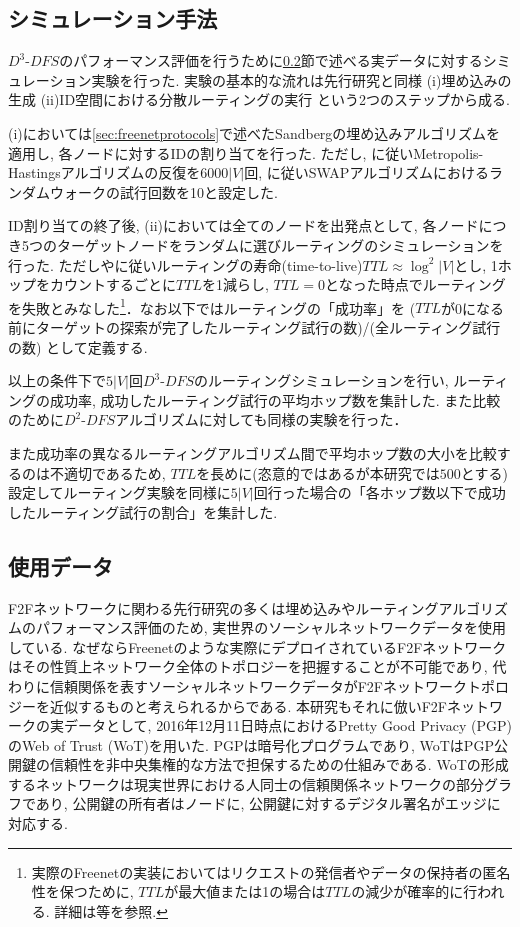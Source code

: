 \documentclass[technicalreport]{./ieicej-v3.0/UTF/ieicej}
\begin{document}
  \subsection{シミュレーション手法}
  $D^3$-$DFS$のパフォーマンス評価を行うために\ref{sec:wot}節で述べる実データに対するシミュレーション実験を行った. 実験の基本的な流れは先行研究と同様 (i)埋め込みの生成 (ii)ID空間における分散ルーティングの実行 という2つのステップから成る.

  (i)においては\ref{sec:freenetprotocols}で述べたSandbergの埋め込みアルゴリズムを適用し, 各ノードに対するIDの割り当てを行った. ただし, \cite{sandberg2006distributed}に従いMetropolis-Hastingsアルゴリズムの反復を$6000|V|$回, \cite{roos2016analyzing}に従いSWAPアルゴリズムにおけるランダムウォークの試行回数を10と設定した.

  ID割り当ての終了後, (ii)においては全てのノードを出発点として, 各ノードにつき5つのターゲットノードをランダムに選びルーティングのシミュレーションを行った. ただし\cite{sandberg2006distributed}や\cite{schiller2011attack}に従いルーティングの寿命(time-to-live)$TTL\approx \log^2|V|$とし, 1ホップをカウントするごとに$TTL$を1減らし, $TTL=0$となった時点でルーティングを失敗とみなした\footnote{実際のFreenetの実装においてはリクエストの発信者やデータの保持者の匿名性を保つために, $TTL$が最大値または1の場合は$TTL$の減少が確率的に行われる. 詳細は\cite{roos2016analyzing}等を参照.}．なお以下ではルーティングの「成功率」を ($TTL$が0になる前にターゲットの探索が完了したルーティング試行の数)/(全ルーティング試行の数) として定義する.

  以上の条件下で$5|V|$回$D^3$-$DFS$のルーティングシミュレーションを行い, ルーティングの成功率, 成功したルーティング試行の平均ホップ数を集計した. また比較のために$D^2$-$DFS$アルゴリズムに対しても同様の実験を行った．

  また成功率の異なるルーティングアルゴリズム間で平均ホップ数の大小を比較するのは不適切であるため, $TTL$を長めに(恣意的ではあるが本研究では$500$とする)設定してルーティング実験を同様に$5|V|$回行った場合の「各ホップ数以下で成功したルーティング試行の割合」を集計した.

  \subsection{使用データ} \label{sec:wot}
  F2Fネットワークに関わる先行研究の多くは埋め込みやルーティングアルゴリズムのパフォーマンス評価のため, 実世界のソーシャルネットワークデータを使用している. なぜならFreenetのような実際にデプロイされているF2Fネットワークはその性質上ネットワーク全体のトポロジーを把握することが不可能であり, 代わりに信頼関係を表すソーシャルネットワークデータがF2Fネットワークトポロジーを近似するものと考えられるからである. 本研究もそれに倣いF2Fネットワークの実データとして, 2016年12月11日時点におけるPretty Good Privacy (PGP)のWeb of Trust (WoT)を用いた. PGPは暗号化プログラムであり, WoTはPGP公開鍵の信頼性を非中央集権的な方法で担保するための仕組みである\cite{zimmermann1995official}. WoTの形成するネットワークは現実世界における人同士の信頼関係ネットワークの部分グラフであり, 公開鍵の所有者はノードに, 公開鍵に対するデジタル署名がエッジに対応する. 
\end{document}
